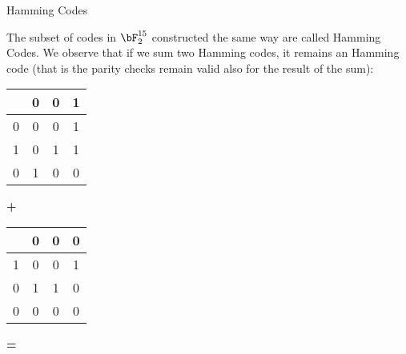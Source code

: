\begin{frame}{Hamming Codes}
    
    The subset of codes in $\bF_2^{15}$ constructed the same way are called Hamming Codes. We observe that if we sum two Hamming codes, it remains an Hamming code (that is the parity checks remain valid also for the result of the sum):

    \begin{minipage}{0.25\textwidth}
        \centering
        \begin{tabular}{|c|c|c|c|}
            \hline
            &  \cellcolor{red!20} 0 & \cellcolor{red!20} 0 & \cellcolor{blue!20}  1 \\ \hline
            \cellcolor{red!20} 0 & \cellcolor{blue!20} 0 & \cellcolor{blue!20}  0 & \cellcolor{blue!20} 1  \\ \hline
            \cellcolor{red!20} 1 & \cellcolor{blue!20} 0 &\cellcolor{blue!20}  1 &\cellcolor{blue!20} 1  \\ \hline
             \rowcolor{blue!20}0 & 1 & 0 & 0  \\ \hline
        \end{tabular}
    \end{minipage}
    \begin{minipage}{0.05\textwidth}
    \centering
        \textbf{+}
    \end{minipage}
    \begin{minipage}{0.25\textwidth}
    \centering
        \begin{tabular}{|c|c|c|c|}
            \hline
            &  \cellcolor{red!20} 0 & \cellcolor{red!20} 0 & \cellcolor{blue!20}  0 \\ \hline
            \cellcolor{red!20} 1 & \cellcolor{blue!20} 0 & \cellcolor{blue!20}  0 & \cellcolor{blue!20} 1  \\ \hline
            \cellcolor{red!20} 0 & \cellcolor{blue!20} 1 &\cellcolor{blue!20}  1 &\cellcolor{blue!20} 0  \\ \hline
             \rowcolor{blue!20}0 & 0 & 0 & 0  \\ \hline
        \end{tabular}
    \end{minipage}
    \begin{minipage}{0.05\textwidth}
    \centering
        \textbf{=}
    \end{minipage}
%
    \begin{minipage}{0.25\textwidth}
    \centering
        \begin{tabular}{|c|c|c|c|}

\end{tabular}
\end{minipage}
\end{frame}
